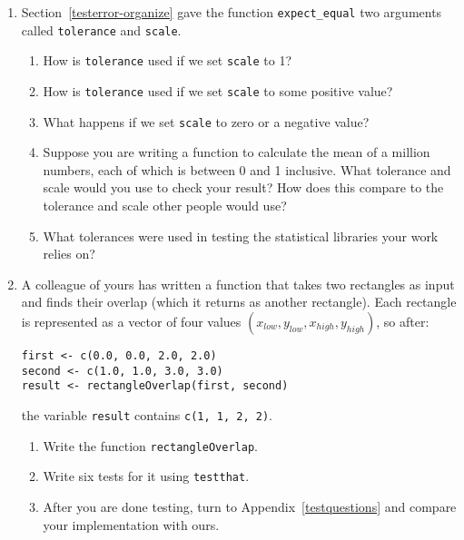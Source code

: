 \begin{enumerate}

\item
  Section~\ref{testerror-organize} gave the function \texttt{expect\_equal} two arguments
  called \texttt{tolerance} and \texttt{scale}.
  \begin{enumerate}
    \item
      How is \texttt{tolerance} used if we set \texttt{scale} to 1?
    \item
      How is \texttt{tolerance} used if we set \texttt{scale} to some positive value?
    \item
      What happens if we set \texttt{scale} to zero or a negative value?
    \item
      Suppose you are writing a function to calculate the mean of a million numbers,
      each of which is between 0 and 1 inclusive.
      What tolerance and scale would you use to check your result?
      How does this compare to the tolerance and scale other people would use?
    \item
      What tolerances were used in testing the statistical libraries your work relies on?
  \end{enumerate}

\item
  \label{rectangle-overlap}
  A colleague of yours has written a function that takes two rectangles as input
  and finds their overlap (which it returns as another rectangle).
  Each rectangle is represented as a vector of four values $(x_{low}, y_{low}, x_{high}, y_{high})$,
  so after:

\begin{lstlisting}
first <- c(0.0, 0.0, 2.0, 2.0)
second <- c(1.0, 1.0, 3.0, 3.0)
result <- rectangleOverlap(first, second)
\end{lstlisting}

  \noindent
  the variable \texttt{result} contains \texttt{c(1, 1, 2, 2)}.
  \begin{enumerate}
  \item
    Write the function \texttt{rectangleOverlap}.
  \item
    Write six tests for it using \texttt{testthat}.
  \item
    After you are done testing, turn to Appendix~\ref{testquestions}
    and compare your implementation with ours.
  \end{enumerate}

\end{enumerate}
